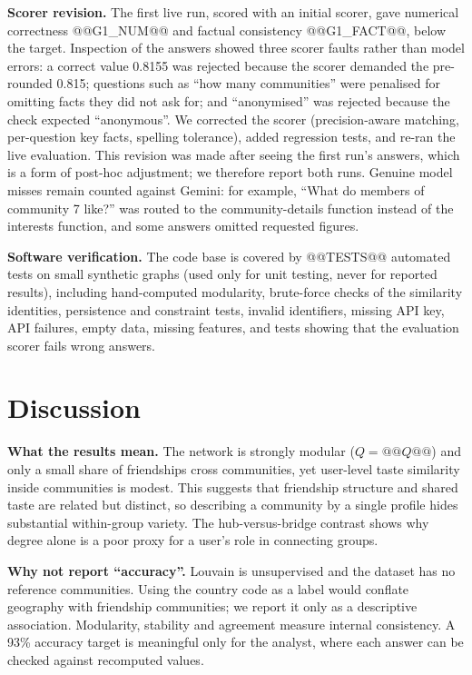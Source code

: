 \documentclass[conference]{IEEEtran}
\begin{document}
\textbf{Scorer revision.} The first live run, scored with an initial scorer, gave numerical correctness @@G1_NUM@@ and factual consistency @@G1_FACT@@, below the target. Inspection of the answers showed three scorer faults rather than model errors: a correct value 0.8155 was rejected because the scorer demanded the pre-rounded 0.815; questions such as ``how many communities'' were penalised for omitting facts they did not ask for; and ``anonymised'' was rejected because the check expected ``anonymous''. We corrected the scorer (precision-aware matching, per-question key facts, spelling tolerance), added regression tests, and re-ran the live evaluation. This revision was made after seeing the first run's answers, which is a form of post-hoc adjustment; we therefore report both runs. Genuine model misses remain counted against Gemini: for example, ``What do members of community 7 like?'' was routed to the community-details function instead of the interests function, and some answers omitted requested figures.

\textbf{Software verification.} The code base is covered by @@TESTS@@ automated tests on small synthetic graphs (used only for unit testing, never for reported results), including hand-computed modularity, brute-force checks of the similarity identities, persistence and constraint tests, invalid identifiers, missing API key, API failures, empty data, missing features, and tests showing that the evaluation scorer fails wrong answers.

\section{Discussion}\label{sec:disc}
\textbf{What the results mean.} The network is strongly modular ($Q=@@Q@@$) and only a small share of friendships cross communities, yet user-level taste similarity inside communities is modest. This suggests that friendship structure and shared taste are related but distinct, so describing a community by a single profile hides substantial within-group variety. The hub-versus-bridge contrast shows why degree alone is a poor proxy for a user's role in connecting groups.

\textbf{Why not report ``accuracy''.} Louvain is unsupervised and the dataset has no reference communities. Using the country code as a label would conflate geography with friendship communities; we report it only as a descriptive association. Modularity, stability and agreement measure internal consistency. A 93\% accuracy target is meaningful only for the analyst, where each answer can be checked against recomputed values.
\end{document}
